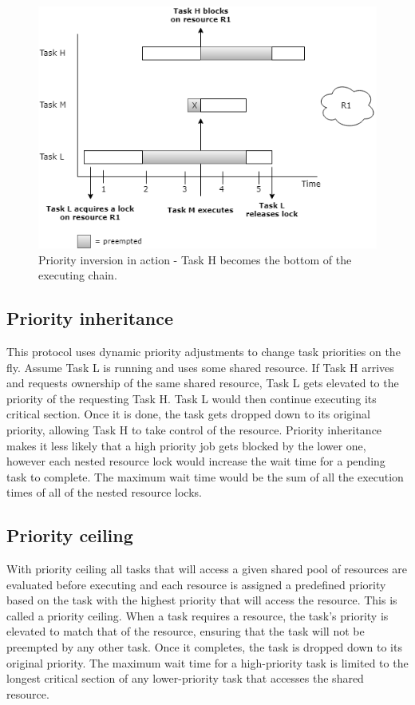 \begin{figure}[!ht]
	\centering
	\includegraphics[scale=0.5]{realTimeComputing/fig/PriorityInversion.png}
	\caption{Priority inversion in action - Task H becomes the bottom of the executing chain.}
	\label{fig:priorityinversion}
\end{figure}

\subsection{Priority inheritance}

This protocol uses dynamic priority adjustments to change task priorities on the fly. Assume Task L is running and uses some shared resource. If Task H arrives and requests ownership of the same shared resource, Task L gets elevated to the priority of the requesting Task H. Task L would then continue executing its critical section. Once it is done, the task gets dropped down to its original priority, allowing Task H to take control of the resource. Priority inheritance makes it less likely that a high priority job gets blocked by the lower one, however each nested resource lock would increase the wait time for a pending task to complete. The maximum wait time would be the sum of all the execution times of all of the nested resource locks.

\subsection{Priority ceiling}

With priority ceiling all tasks that will access a given shared pool of resources are evaluated before executing and each resource is assigned a predefined priority based on the task with the highest priority that will access the resource. This is called a priority ceiling. When a task requires a resource, the task's priority is elevated to match that of the resource, ensuring that the task will not be preempted by any other task. Once it completes, the task is dropped down to its original priority. The maximum wait time for a high-priority task is limited to the longest critical section of any lower-priority task that accesses the shared resource.

